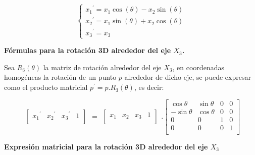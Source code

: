 \begin{equation}\label{eq:giro2d}
\begin{cases}
{x_{1}}^{\prime} = x_{1} \cos(\theta) -x_{2} \sin(\theta) \\ 
{x_{2}}^{\prime} = x_{1} \sin(\theta) +x_{2} \cos(\theta) \\
{x_{3}}^{\prime} = x_{3}
\end{cases}
\end{equation}

\begin{center}
\textbf{\footnotesize{Fórmulas para la rotación 3D alrededor del eje $X_{3}$.}}
\end{center}

Sea $R_{3}(\theta)$ la matriz de rotación alrededor del eje $X_{3}$, en coordenadas homogéneas la rotación de un punto $p$ alrededor de dicho eje, se puede expresar como el producto matricial
$p^{\prime} = p.R_{3}(\theta)$, es decir:



\begin{equation}
\begin{array}{rccl}
\left[
\begin{array}{rccl}
{x_{1}}^{\prime} & {x_{2}}^{\prime} & {x_{3}}^{\prime} & 1\\
\end{array}
\right]
\end{array}
=
\begin{array}{rccl}
\left[
\begin{array}{rccl}
x_{1} & x_{2} & x_{3} & 1\\
\end{array}
\right]
\end{array} 
.
\left[
\begin{array}{rccl}
\cos\theta & \sin\theta & 0 & 0\\
-\sin\theta & \cos\theta & 0 & 0\\
0 & 0 & 1 & 0\\
0 & 0 & 0 & 1\\
\end{array}
\right]
\end{equation}

\begin{center}
\textbf{\footnotesize{Expresión matricial para la rotación 3D alrededor del eje $X_{3}$}}
\end{center}

